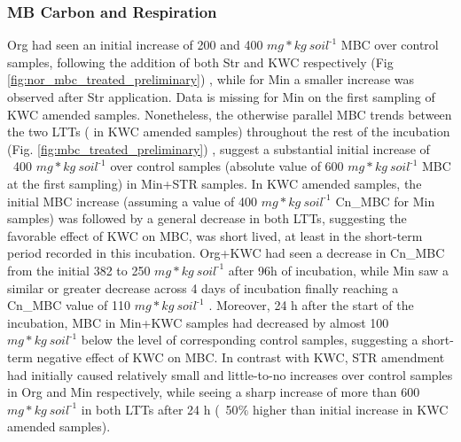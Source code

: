 \documentclass[12pt]{report}
\newlength{\SpaceAfterUnit}
\newcommand{\genericunit}{$ mg * kg\ soil^{\text{-}1}$ \hspace*{\SpaceAfterUnit}}
\begin{document}
    \subsubsection{MB Carbon and Respiration}
        Org had seen an initial increase of 200 and 400 \genericunit MBC over control samples, following the addition of both Str and KWC respectively (Fig \ref{fig:nor_mbc_treated_preliminary}) , while for Min a smaller increase was observed after Str application. Data is missing for Min on the first sampling of KWC  amended samples. Nonetheless, the otherwise parallel MBC trends between the two LTTs ( in KWC amended samples) throughout the rest of the incubation (Fig. \ref{fig:mbc_treated_preliminary}) , suggest a substantial initial increase of ~400 \genericunit over control samples (absolute value of 600 \genericunit MBC at the first sampling)  in Min+STR samples.
        In KWC amended samples, the initial MBC increase (assuming a value of 400 \genericunit Cn\_MBC for Min samples) was followed by a general decrease in both LTTs, suggesting the favorable effect of KWC on MBC,  was short lived, at least in the short-term period recorded in this incubation. Org+KWC had seen a decrease in Cn\_MBC from the initial 382 to 250 \genericunit after 96h of incubation, while Min saw a similar or greater decrease across 4 days of incubation finally reaching a Cn\_MBC value of  110 \genericunit. Moreover, 24 h after the start of the incubation, MBC in Min+KWC samples had decreased by almost 100 \genericunit below the level of corresponding control samples,  suggesting a short-term negative effect of KWC on MBC. In contrast with KWC, STR amendment had initially caused relatively small and little-to-no increases over control samples in Org and Min respectively, while seeing a sharp increase of more than 600 \genericunit in both LTTs after 24 h (~50$\%$ higher than initial increase in KWC amended samples).\\ 
\end{document}
